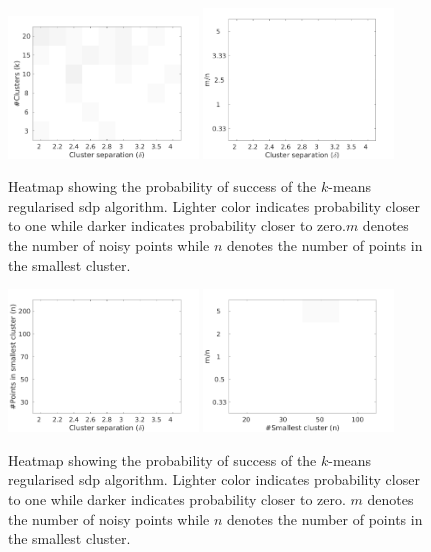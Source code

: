 \documentclass[12pt]{article}
\begin{document}
\begin{figure}
  \includegraphics[width=0.45\textwidth]{figures/optimizationClustering/deltaK.png}
  \includegraphics[width=0.45\textwidth]{figures/optimizationClustering/deltaM.png}
  \caption{Heatmap showing the probability of success of the $k$-means regularised sdp algorithm. Lighter color indicates probability closer to one while darker indicates probability closer to zero.$m$ denotes the number of noisy points while $n$ denotes the number of points in the smallest cluster.}
  \label{a-figure:simulationSepK}
\end{figure}
\begin{figure}
  \includegraphics[width=0.45\textwidth]{figures/optimizationClustering/deltan.png}
  \includegraphics[width=0.45\textwidth]{figures/optimizationClustering/nM.png}
  \caption{Heatmap showing the probability of success of the $k$-means regularised sdp algorithm. Lighter color indicates probability closer to one while darker indicates probability closer to zero. $m$ denotes the number of noisy points while $n$ denotes the number of points in the smallest cluster.}  
  \label{a-figure:simulationSepN}
\end{figure}
\end{document}
